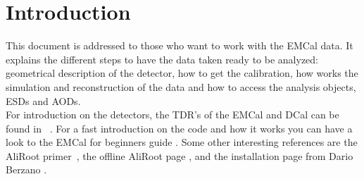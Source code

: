 \section{Introduction}




This document is addressed to those who want to work with the EMCal data. It explains the different steps to have the data taken ready to be analyzed: geometrical description of the detector, how to get the calibration, how works the simulation and reconstruction of the data and how to access the analysis objects, ESDs and AODs.\\

For introduction on the detectors, the TDR's of the EMCal and DCal can be found in ~\cite{EMCalTDR,DCalTDR}.
For a fast introduction on the code and how it works you can have a look to the EMCal for beginners guide \cite{EMCAL:beginners}. Some other interesting references are the AliRoot primer~\cite{ALIROOT:doc}, the offline AliRoot page \cite{ALIROOT}, and the installation page from Dario Berzano \cite{ALIROOT:berzano}.\\

